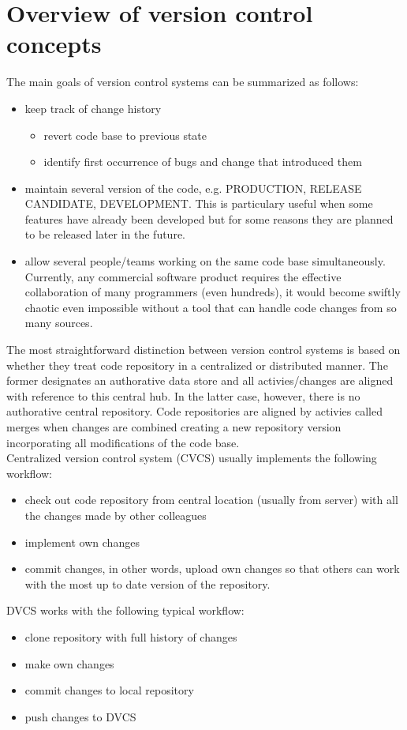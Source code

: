 \section{Overview of version control concepts}
The main goals of version control systems can be summarized as follows:
\begin{itemize}
    \item keep track of change history
    \begin{itemize}
        \item revert code base to previous state
        \item identify first occurrence of bugs and change that introduced them
    \end{itemize} 
    \item maintain several version of the code, e.g. PRODUCTION, RELEASE CANDIDATE, DEVELOPMENT. This is particulary
    useful when some features have already been developed but for some reasons they are planned to be released later in 
    the future.
    \item allow several people/teams working on the same code base simultaneously. Currently, any commercial software
    product requires the effective collaboration of many programmers (even hundreds), it would become swiftly chaotic
    even impossible without a tool that can handle code changes from so many sources.
\end{itemize}
The most straightforward distinction between version control systems is based on whether they treat code repository in 
a centralized or distributed manner. The former designates an authorative data store and all activies/changes are 
aligned with reference to this central hub. In the latter case, however, there is no authorative central repository.
Code repositories are aligned by activies called merges when changes are combined creating a new repository version 
incorporating all modifications of the code base. \\
Centralized version control system (CVCS) usually implements the following workflow:
\begin{itemize}
    \item check out code repository from central location (usually from server) with all the changes made by other
    colleagues
    \item implement own changes
    \item commit changes, in other words, upload own changes so that others can work with the most up to date version of
    the repository.
\end{itemize}
DVCS works with the following typical workflow:
\begin{itemize}
    \item clone repository with full history of changes
    \item make own changes
    \item commit changes to local repository
    \item push changes to DVCS
\end{itemize}
